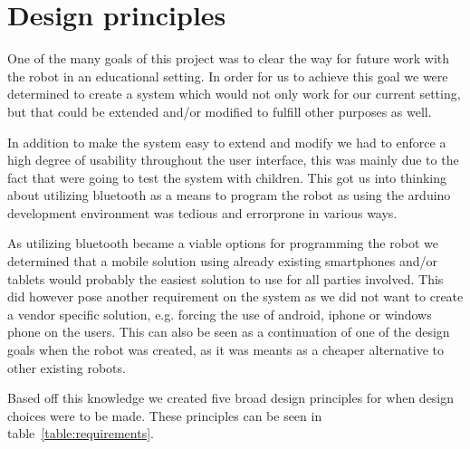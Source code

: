 \section{Design principles}
One of the many goals of this project was to clear the way for future work with the \chirp robot in an educational setting. In order for us to achieve this goal we were determined to create a system which would not only work for our current setting, but that could be extended and/or modified to fulfill other purposes as well.

\bigskip\noindent
In addition to make the system easy to extend and modify we had to enforce a high degree of usability throughout the user interface, this was mainly due to the fact that were going to test the system with children. This got us into thinking about utilizing bluetooth as a means to program the robot as using the arduino development environment was tedious and errorprone in various ways. 

\bigskip\noindent
As utilizing bluetooth became a viable options for programming the robot we determined that a mobile solution using already existing smartphones and/or tablets would probably the easiest solution to use for all parties involved. This did however pose another requirement on the system as we did not want to create a vendor specific solution, e.g. forcing the use of android, iphone or windows phone on the users. 
This can also be seen as a continuation of one of the design goals when the \chirp robot was created, as it was meants as a cheaper alternative to other existing robots. 

\bigskip\noindent
Based off this knowledge we created five broad design principles for when design choices were to be made. These principles can be seen in table~\ref{table:requirements}.
	
	
	
	
	
	
	